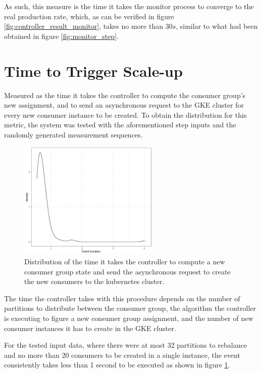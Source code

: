 As such, this measure is the time it takes the monitor process to converge to
the real production rate, which, as can be verified in figure
\ref{fig:controller_result_monitor}, takes no more than $30s$, similar to what
had been obtained in figure \ref{fig:monitor_step}.

\section{Time to Trigger Scale-up}

Measured as the time it takes the controller to compute the consumer group's new
assignment, and to send an asynchronous request to the GKE cluster for every new
consumer instance to be created. To obtain the distribution for this metric, the
system was tested with the aforementioned step inputs and the randomly generated
measurement sequences.

\begin{figure}[htb!]
\centering
\includegraphics[width=0.6\textwidth]{images/integration/delta2.png}
\caption{
    Distribution of the time it takes the controller to compute a new
    consumer group state and send the asynchronous request to create the new
    consumers to the kubernetes cluster.
}
\label{fig:controller_result_trigger}
\end{figure}

The time the controller takes with this procedure depends on the number of
partitions to distribute between the consumer group, the algorithm the
controller is executing to figure a new consumer group assignment, and the
number of new consumer instances it has to create in the GKE cluster.

For the tested input data, where there were at most 32 partitions to rebalance
and no more than 20 consumers to be created in a single instance, the event
consistently takes less than 1 second to be executed as shown in figure
\ref{fig:controller_result_trigger}.

